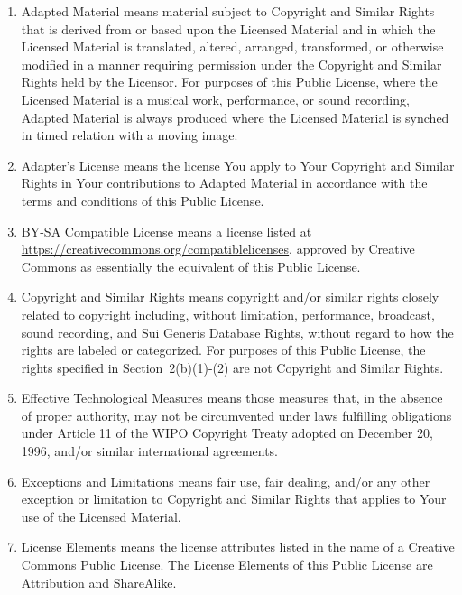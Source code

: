 \begin{enumerate}[label=\alph*.,ref=\alph*]
\item Adapted Material means material subject to Copyright and Similar
  Rights that is derived from or based upon the Licensed Material and
  in which the Licensed Material is translated, altered, arranged,
  transformed, or otherwise modified in a manner requiring permission
  under the Copyright and Similar Rights held by the Licensor. For
  purposes of this Public License, where the Licensed Material is a
  musical work, performance, or sound recording, Adapted Material is
  always produced where the Licensed Material is synched in timed
  relation with a moving image.

\item Adapter's License means the license You apply to Your Copyright
  and Similar Rights in Your contributions to Adapted Material in
  accordance with the terms and conditions of this Public License.

\item BY-SA Compatible License means a license listed at
  \url{https://creativecommons.org/compatiblelicenses}, approved by
  Creative Commons as essentially the equivalent of this Public
  License.

\item Copyright and Similar Rights means copyright and/or similar rights
     closely related to copyright including, without limitation,
     performance, broadcast, sound recording, and Sui Generis Database
     Rights, without regard to how the rights are labeled or
     categorized. For purposes of this Public License, the rights
     specified in Section~2(b)(1)-(2) are not Copyright and Similar
     Rights.

\item Effective Technological Measures means those measures that, in
  the absence of proper authority, may not be circumvented under laws
  fulfilling obligations under Article 11 of the WIPO Copyright Treaty
  adopted on December 20, 1996, and/or similar international
  agreements.

\item Exceptions and Limitations means fair use, fair dealing, and/or
  any other exception or limitation to Copyright and Similar Rights
  that applies to Your use of the Licensed Material.

\item License Elements means the license attributes listed in the name
  of a Creative Commons Public License. The License Elements of this
  Public License are Attribution and ShareAlike.


\end{enumerate}
